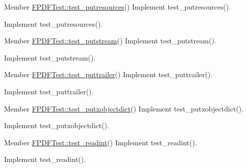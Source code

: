 \label{todo__todo000220}
\hypertarget{todo__todo000220}{}
 
\begin{DoxyDescription}
\item[Member \hyperlink{class_f_p_d_f_test_a1779adfdb24275496427c9fe9c754a3b}{FPDFTest::test\_\-putresources}() ]Implement test\_\-putresources().

Implement test\_\-putresources().
\end{DoxyDescription}

\label{todo__todo000213}
\hypertarget{todo__todo000213}{}
 
\begin{DoxyDescription}
\item[Member \hyperlink{class_f_p_d_f_test_af785ec3d8ea97c0aade2a69431d3a094}{FPDFTest::test\_\-putstream}() ]Implement test\_\-putstream().

Implement test\_\-putstream().
\end{DoxyDescription}

\label{todo__todo000224}
\hypertarget{todo__todo000224}{}
 
\begin{DoxyDescription}
\item[Member \hyperlink{class_f_p_d_f_test_a464291a3e058de44a07fb6052e387c3c}{FPDFTest::test\_\-puttrailer}() ]Implement test\_\-puttrailer().

Implement test\_\-puttrailer().
\end{DoxyDescription}

\label{todo__todo000218}
\hypertarget{todo__todo000218}{}
 
\begin{DoxyDescription}
\item[Member \hyperlink{class_f_p_d_f_test_a2f8b1ef95fff501841f100f749a1f07d}{FPDFTest::test\_\-putxobjectdict}() ]Implement test\_\-putxobjectdict().

Implement test\_\-putxobjectdict().
\end{DoxyDescription}

\label{todo__todo000210}
\hypertarget{todo__todo000210}{}
 
\begin{DoxyDescription}
\item[Member \hyperlink{class_f_p_d_f_test_ab8364fc0f5e8c885db9fa47d9681f92d}{FPDFTest::test\_\-readint}() ]Implement test\_\-readint().

Implement test\_\-readint().
\end{DoxyDescription}

